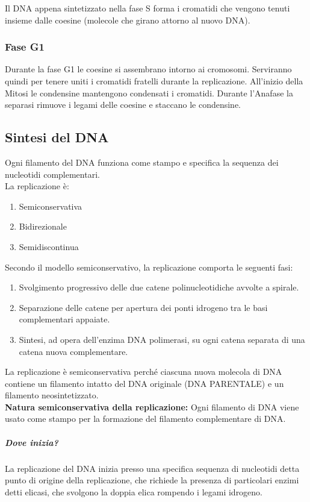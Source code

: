 \documentclass{article}
\begin{document}
Il DNA appena sintetizzato nella fase S forma i cromatidi che vengono tenuti insieme dalle coesine (molecole che girano attorno al nuovo DNA). 

\subsubsection{Fase G1} Durante la fase G1 le coesine si assembrano intorno ai cromosomi. Serviranno quindi per tenere uniti i cromatidi fratelli durante la replicazione. All'inizio della Mitosi le condensine mantengono condensati i cromatidi. Durante l'Anafase la separasi rimuove i legami delle coesine e staccano le condensine. 

\subsection{Sintesi del DNA}Ogni filamento del DNA funziona come stampo e specifica la sequenza dei nucleotidi complementari. \\[1ex]
La replicazione è: 
\begin{enumerate}
    \item Semiconservativa 
    \item Bidirezionale 
    \item Semidiscontinua 
\end{enumerate}

\noindent Secondo il modello semiconservativo, la replicazione comporta le seguenti fasi: 
\begin{enumerate}
    \item Svolgimento progressivo delle due catene polinucleotidiche avvolte a spirale. 
    \item Separazione delle catene per apertura dei ponti idrogeno tra le basi complementari appaiate. 
    \item Sintesi, ad opera dell'enzima DNA polimerasi, su ogni catena separata di una catena nuova complementare. 
\end{enumerate}

La replicazione è semiconservativa perché ciascuna nuova molecola di DNA contiene un filamento intatto del DNA originale (DNA PARENTALE) e un filamento neosintetizzato. 
\\[1ex]
\textbf{Natura semiconservativa della replicazione:} Ogni filamento di DNA viene usato come stampo per la formazione del filamento complementare di DNA. 

\subparagraph{Dove inizia?} La replicazione del DNA inizia presso una specifica sequenza di nucleotidi detta punto di origine della replicazione, che richiede la presenza di particolari enzimi detti elicasi, che svolgono la doppia elica rompendo i legami idrogeno. 
\end{document}
